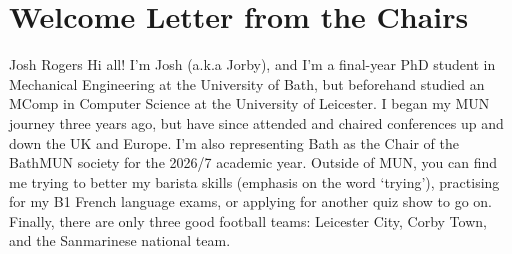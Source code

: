 \section{Welcome Letter from the Chairs}

\begin{chairletter}{Josh Rogers}
Hi all! I’m Josh (a.k.a Jorby), and I’m a final-year PhD student in Mechanical Engineering at the University of Bath, but beforehand studied an MComp in Computer Science at the University of Leicester. I began my MUN journey three years ago, but have since attended and chaired conferences up and down the UK and Europe. I’m also representing Bath as the Chair of the BathMUN society for the 2026/7 academic year. Outside of MUN, you can find me trying to better my barista skills (emphasis on the word ‘trying’), practising for my B1 French language exams, or applying for another quiz show to go on. Finally, there are only three good football teams: Leicester City, Corby Town, and the Sanmarinese national team.

\end{chairletter}
